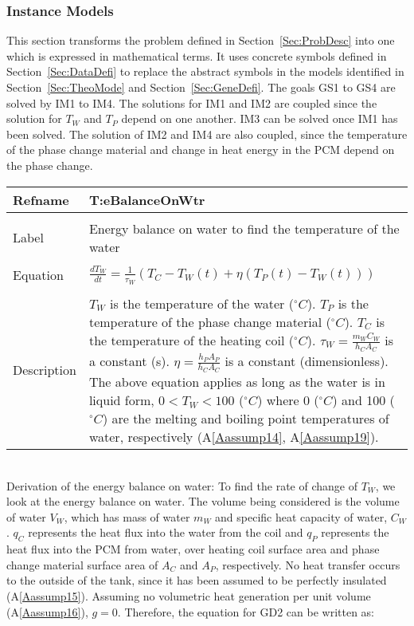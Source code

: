 \documentclass[12pt]{article}
\begin{document}
\subsubsection{Instance Models}
\label{Sec:InstMode}
This section transforms the problem defined in Section~\ref{Sec:ProbDesc} into one which is expressed in mathematical terms. It uses concrete symbols defined in Section~\ref{Sec:DataDefi} to replace the abstract symbols in the models identified in Section~\ref{Sec:TheoMode} and Section~\ref{Sec:GeneDefi}.
The goals GS1 to GS4 are solved by IM1 to IM4. The solutions for IM1 and IM2 are coupled since the solution for $T_{W}$ and $T_{P}$ depend on one another. IM3 can be solved once IM1 has been solved. The solution of IM2 and IM4 are also coupled, since the temperature of the phase change material and change in heat energy in the PCM depend on the phase change.
~\newline
\noindent \begin{minipage}{\textwidth}
\begin{tabular}{p{} p{}}
\toprule \textbf{Refname} & \textbf{T:eBalanceOnWtr}
\label{T:eBalanceOnWtr}
\\ \midrule \\
Label & Energy balance on water to find the temperature of the water
\\ \midrule \\
Equation & $\frac{dT_{W}}{dt}=\frac{1}{\tau{}_{W}}\left(T_{C}-T_{W}\left(t\right)+\eta{}\left(T_{P}\left(t\right)-T_{W}\left(t\right)\right)\right)$
\\ \midrule \\
Description & $T_{W}$ is the temperature of the water (${}^{\circ}C$). $T_{P}$ is the temperature of the phase change material (${}^{\circ}C$). $T_{C}$ is the temperature of the heating coil (${}^{\circ}C$). $\tau{}_{W}=\frac{m_{W}C_{W}}{h_{C}A_{C}}$ is a constant (s). $\eta{}=\frac{h_{P}A_{P}}{h_{C}A_{C}}$ is a constant (dimensionless). The above equation applies as long as the water is in liquid form, $0<T_{W}<100$ (${}^{\circ}C$) where 0 (${}^{\circ}C$) and 100 (${}^{\circ}C$) are the melting and boiling point temperatures of water, respectively (A\ref{Aassump14}, A\ref{Aassump19}).
\\ \bottomrule \end{tabular}
\end{minipage}\\
Derivation of the energy balance on water:
To find the rate of change of $T_{W}$, we look at the energy balance on water. The volume being considered is the volume of water $V_{W}$, which has mass of water $m_{W}$ and specific heat capacity of water, $C_{W}$. $q_{C}$ represents the heat flux into the water from the coil and $q_{P}$ represents the heat flux into the PCM from water, over heating coil surface area and phase change material surface area of $A_{C}$ and $A_{P}$, respectively. No heat transfer occurs to the outside of the tank, since it has been assumed to be perfectly insulated (A\ref{Aassump15}). Assuming no volumetric heat generation per unit volume (A\ref{Aassump16}), $g=0$. Therefore, the equation for GD2 can be written as:
\end{document}

